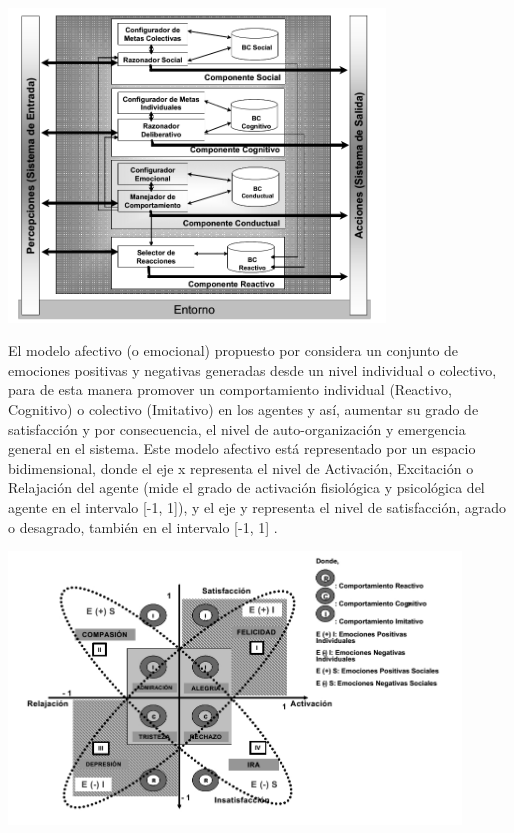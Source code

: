 \begin{ilustracion}[fuente=\cite{perozo2011}, etiqueta=componentes-masoes-individual, titulo={Componentes de MASOES a Nivel Individual}]
\includegraphics[width=10cm]{ilustraciones/marco-teorico/componentes-masoes-individual.jpg}
\end{ilustracion}


El modelo afectivo (o emocional) propuesto por \citeauthor{perozo2011} considera un conjunto de
emociones positivas y negativas generadas desde un nivel individual o colectivo,
para de esta manera promover un comportamiento individual (Reactivo, Cognitivo)
o colectivo (Imitativo) en los agentes y así, aumentar su grado de satisfacción
y por consecuencia, el nivel de auto-organización y emergencia general en el
sistema. Este modelo afectivo está representado por un espacio bidimensional,
donde el eje x representa el nivel de Activación, Excitación o Relajación del
agente (mide el grado de activación fisiológica y psicológica del agente en el
intervalo [-1, 1]), y el eje y representa el nivel de satisfacción, agrado o
desagrado, también en el intervalo [-1, 1] .

\begin{ilustracion}[fuente=\cite{perozo2011}, etiqueta=modelo-afectivo, titulo={Modelo Afectivo para MASOES}]
\includegraphics[width=12cm]{ilustraciones/marco-teorico/modelo-afectivo.jpg}
\end{ilustracion}

